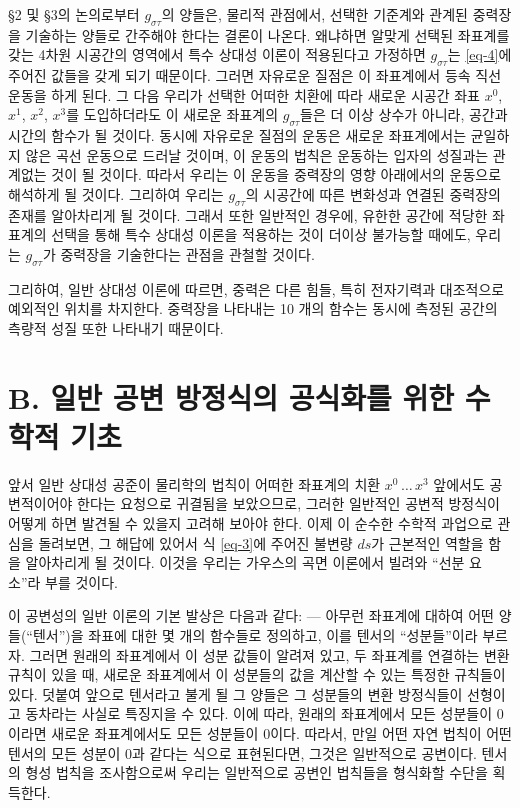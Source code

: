 \S 2 및 \S 3의 논의로부터 $g_{\sigma\tau}$의 양들은, 물리적 관점에서, 선택한 기준계와 관계된 중력장을 기술하는 양들로 간주해야 한다는 결론이 나온다. 왜냐하면 알맞게 선택된 좌표계를 갖는 4차원 시공간의 영역에서 특수 상대성 이론이 적용된다고 가정하면 $g_{\sigma\tau}$는 \eqref{eq-4}에 주어진 값들을 갖게 되기 때문이다. 그러면 자유로운 질점은 이 좌표계에서 등속 직선 운동을 하게 된다. 그 다음 우리가 선택한 어떠한 치환에 따라 새로운 시공간 좌표 $x^0$, $x^1$, $x^2$, $x^3$를 도입하더라도 이 새로운 좌표계의 $g_{\sigma\tau}$들은 더 이상 상수가 아니라, 공간과 시간의 함수가 될 것이다. 동시에 자유로운 질점의 운동은 새로운 좌표계에서는 균일하지 않은 곡선 운동으로 드러날 것이며, 이 운동의 법칙은 운동하는 입자의 성질과는 관계없는 것이 될 것이다. 따라서 우리는 이 운동을 중력장의 영향 아래에서의 운동으로 해석하게 될 것이다. 그리하여 우리는 $g_{\sigma\tau}$의 시공간에 따른 변화성과 연결된 중력장의 존재를 알아차리게 될 것이다. 그래서 또한 일반적인 경우에, 유한한 공간에 적당한 좌표계의 선택을 통해 특수 상대성 이론을 적용하는 것이 더이상 불가능할 때에도, 우리는 $g_{\sigma\tau}$가 중력장을 기술한다는 관점을 관철할 것이다.

그리하여, 일반 상대성 이론에 따르면, 중력은 다른 힘들, 특히 전자기력과 대조적으로 예외적인 위치를 차지한다. 중력장을 나타내는 10 개의 함수는 동시에 측정된 공간의 측량적 성질 또한 나타내기 때문이다.

\section*{B. 일반 공변 방정식의 공식화를 위한 수학적 기초}

앞서 일반 상대성 공준이 물리학의 법칙이 어떠한 좌표계의 치환 $x^0\,\dots\,x^3$ 앞에서도 공변적이어야 한다는 요청으로 귀결됨을 보았으므로, 그러한 일반적인 공변적 방정식이 어떻게 하면 발견될 수 있을지 고려해 보아야 한다. 
이제 이 순수한 수학적 과업으로 관심을 돌려보면, 그 해답에 있어서 식 \eqref{eq-3}에 주어진 불변량 $ds$가 근본적인 역할을 함을 알아차리게 될 것이다. 이것을 우리는 가우스의 곡면 이론에서 빌려와 ``선분 요소''라 부를 것이다.

이 공변성의 일반 이론의 기본 발상은 다음과 같다: --- 아무런 좌표계에 대하여 어떤 양들(``텐서'')을 좌표에 대한 몇 개의 함수들로 정의하고, 이를 텐서의 ``성분들''이라 부르자. 그러면 원래의 좌표계에서 이 성분 값들이 알려져 있고, 두 좌표계를 연결하는 변환 규칙이 있을 때, 새로운 좌표계에서 이 성분들의 값을 계산할 수 있는 특정한 규칙들이 있다. 덧붙여 앞으로 텐서라고 불게 될 그 양들은 그 성분들의 변환 방정식들이 선형이고 동차라는 사실로 특징지을 수 있다. 이에 따라, 원래의 좌표계에서 모든 성분들이 0이라면 새로운 좌표계에서도 모든 성분들이 0이다. 따라서, 만일 어떤 자연 법칙이 어떤 텐서의 모든 성분이 0과 같다는 식으로 표현된다면, 그것은 일반적으로 공변이다. 텐서의 형성 법칙을 조사함으로써 우리는 일반적으로 공변인 법칙들을 형식화할 수단을 획득한다.

